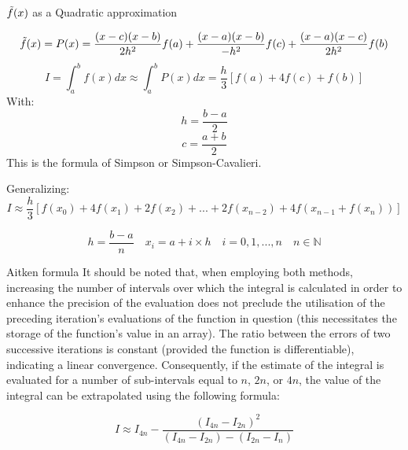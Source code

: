\documentclass[xcolor={dvipsnames,rgb}, aspectratio=169]{beamer}
\begin{document}
\begin{frame}{$\Tilde{f}(x)$ as a \alert{Quadratic} approximation}

   \begin{equation*}
      \Tilde{f}(x) = P(x) = \frac{(x-c)(x-b)}{2h^{2}}f(a) +
      \frac{(x-a)(x-b)}{-h^{2}}f(c) + \frac{(x-a)(x-c)}{2h^{2}}f(b)
   \end{equation*}
   \begin{equation*}
      I = \int_{a}^{b} f(x) dx \approx \int_{a}^{b} P(x) dx = \frac{h}{3}\left[f(a) + 4f(c)+f(b)\right]
   \end{equation*}
   With:
   \begin{equation*}
      h = \frac{b-a}{2}
   \end{equation*}
   \begin{equation*}
      c = \frac{a+b}{2}
   \end{equation*}
   This is the formula of Simpson or Simpson-Cavalieri.
\end{frame}

\begin{frame}{}
   Generalizing:
   \begin{equation*}
      I \approx
      \frac{h}{3}\left[f(x_{0})+4f(x_{1})+2f(x_{2})+...+2f(x_{n-2})+4f(x_{n-1}+f(x_{n}))\right]
   \end{equation*}

   \begin{equation*}
      h = \frac{b-a}{n} \quad x_{i} = a + i \times h \quad i = 0, 1, ..., n \quad n \in
      \mathbb{N}
   \end{equation*}
\end{frame}

\begin{frame}{Aitken formula}
   It should be noted that, when employing both methods, increasing the number of
   intervals over which the integral is calculated in order to enhance the precision of
   the evaluation does not preclude the utilisation of the preceding iteration's
   evaluations of the function in question (this necessitates the storage of the
   function's value in an array). The ratio between the errors of two successive
   iterations is constant (provided the function is differentiable), indicating a linear
   convergence. Consequently, if the estimate of the integral is evaluated for a number
   of sub-intervals equal to $n$, $2n$, or $4n$, the value of the integral can be
   extrapolated using the following formula:

   \begin{equation*}
      I \approx I_{4n} -
      \frac{\left(I_{4n}-I_{2n}\right)^{2}}{\left(I_{4n}-I_{2n}\right)-\left(I_{2n}-I_{n}\right)}
   \end{equation*}
\end{frame}
\end{document}
